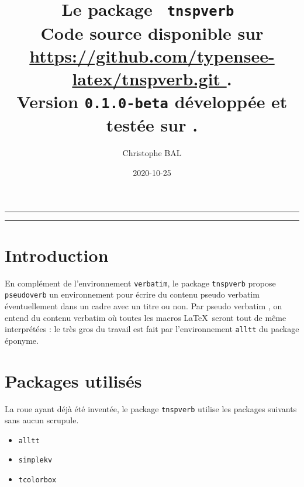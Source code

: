 \documentclass[12pt,a4paper]{article}
\theoremstyle{definition}
\newcommand\env[1]{\texttt{#1}}
\begin{document}
\renewcommand\labelitemi{\raisebox{0.125em}{\tiny\textbullet}}
\renewcommand{\labelitemii}{---}

\title{   %
	Le package \texttt{ tnspverb }\\%
	{\footnotesize Code source disponible sur \url{ https://github.com/typensee-latex/tnspverb.git }.}\\%
{\footnotesize Version \texttt{0.1.0-beta} développée et testée sur \macosxname{}.}%
}
\author{Christophe BAL}
\date{2020-10-25}

\maketitle


\vspace{2em}

\hrule

\tableofcontents

\vspace{1.5em}

\hrule

\newpage

\section{Introduction}

En complément de l'environnement \env{verbatim}, le package \verb#tnspverb# propose  \env{pseudoverb} un environnement pour écrire du contenu \og pseudo verbatim \fg{} éventuellement dans un cadre avec un titre ou non.
Par \og pseudo verbatim \fg{}, on entend du contenu verbatim où toutes les macros \LaTeX\ seront tout de même interprétées : le très gros du travail est fait par l'environnement \verb#alltt# du package éponyme.

\section{Packages utilisés}

La roue ayant déjà été inventée, le package \verb#tnspverb# utilise les packages suivants sans aucun scrupule.

\begin{multicols}{4}
    \begin{itemize}
        \item \verb#alltt#
        \item \verb#simplekv#
        \item \verb#tcolorbox#
    \end{itemize}
\end{multicols}
\end{document}
